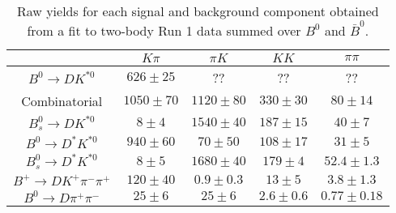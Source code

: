 \begin{table}
  \centering
  \begin{tabular}{ccccc}
      \toprule
       & $K\pi$ & $\pi K$ & $KK$ & $\pi\pi$ \\
      \midrule
      $B^0 \to DK^{*0}$ & $626 \pm 25$ & ?? & ?? & ?? \\
      Combinatorial & $1050 \pm 70$ & $1120 \pm 80$ & $330 \pm 30$ & $80 \pm 14$ \\
      $B^0_s \to DK^{*0}$ & $8 \pm 4$ & $1540 \pm 40$ & $187 \pm 15$ & $40 \pm 7$ \\
      $B^0 \to D^*K^{*0}$ & $940 \pm 60$ & $70 \pm 50$ & $108 \pm 17$ & $31 \pm 5$ \\
      $B^0_s \to D^*K^{*0}$ & $8 \pm 5$ & $1680 \pm 40$ & $179 \pm 4$ & $52.4 \pm 1.3$ \\
      $B^+ \to DK^+\pi^-\pi^+$ & $120 \pm 40$ & $0.9 \pm 0.3$ & $13 \pm 5$ & $3.8 \pm 1.3$ \\
      $B^0 \to D\pi^+\pi^-$ & $25 \pm 6$ & $25 \pm 6$ & $2.6 \pm 0.6$ & $0.77 \pm 0.18$ \\
      \bottomrule
      \end{tabular}
  \caption{Raw yields for each signal and background component obtained from a fit to two-body Run 1 data summed over $B^0$ and $\bar{B}^0$.}
\label{tab:yields_combined_2body_run1}
\end{table}
